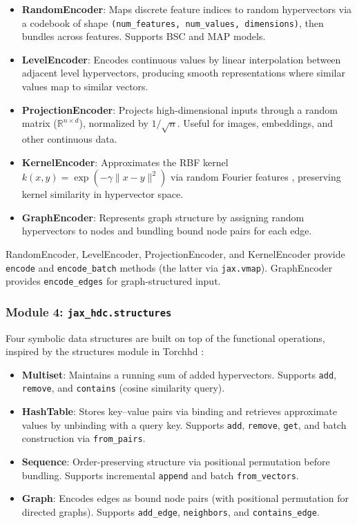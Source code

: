 \documentclass[twoside,11pt]{article}
\begin{document}
\begin{itemize}
\item \textbf{RandomEncoder}: Maps discrete feature indices to random hypervectors via a codebook of shape \texttt{(num\_features, num\_values, dimensions)}, then bundles across features. Supports BSC and MAP models.
\item \textbf{LevelEncoder}: Encodes continuous values by linear interpolation between adjacent level hypervectors, producing smooth representations where similar values map to similar vectors.
\item \textbf{ProjectionEncoder}: Projects high-dimensional inputs through a random matrix ($\mathbb{R}^{n \times d}$), normalized by $1/\sqrt{n}$. Useful for images, embeddings, and other continuous data.
\item \textbf{KernelEncoder}: Approximates the RBF kernel $k(x,y) = \exp(-\gamma \|x-y\|^2)$ via random Fourier features \citep{rahimi2007random}, preserving kernel similarity in hypervector space.
\item \textbf{GraphEncoder}: Represents graph structure by assigning random hypervectors to nodes and bundling bound node pairs for each edge.
\end{itemize}

RandomEncoder, LevelEncoder, ProjectionEncoder, and KernelEncoder provide \texttt{encode} and \texttt{encode\_batch} methods (the latter via \texttt{jax.vmap}). GraphEncoder provides \texttt{encode\_edges} for graph-structured input.

\subsubsection{Module 4: \texttt{jax\_hdc.structures}}

Four symbolic data structures are built on top of the functional operations, inspired by the structures module in Torchhd \citep{heddes2023torchhd}:

\begin{itemize}
\item \textbf{Multiset}: Maintains a running sum of added hypervectors. Supports \texttt{add}, \texttt{remove}, and \texttt{contains} (cosine similarity query).
\item \textbf{HashTable}: Stores key--value pairs via binding and retrieves approximate values by unbinding with a query key. Supports \texttt{add}, \texttt{remove}, \texttt{get}, and batch construction via \texttt{from\_pairs}.
\item \textbf{Sequence}: Order-preserving structure via positional permutation before bundling. Supports incremental \texttt{append} and batch \texttt{from\_vectors}.
\item \textbf{Graph}: Encodes edges as bound node pairs (with positional permutation for directed graphs). Supports \texttt{add\_edge}, \texttt{neighbors}, and \texttt{contains\_edge}.
\end{itemize}
\end{document}
